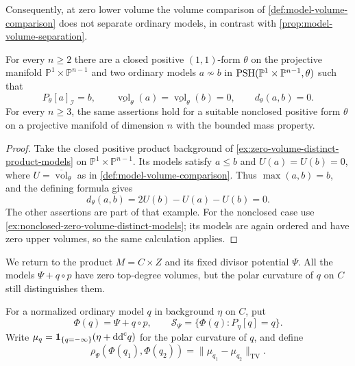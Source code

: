 Consequently, at zero lower volume the volume comparison of \cref{def:model-volume-comparison} does not separate ordinary models, in contrast with \cref{prop:model-volume-separation}.

\begin{example}\label{ex:zero-volume-comparison-collapse}
For every $n\geq2$ there are a closed positive $(1,1)$-form $\theta$ on the projective manifold $\mathbb P^1\times\mathbb P^{n-1}$ and two ordinary models $a\not\sim b$ in $\mathrm{PSH}(\mathbb P^1\times\mathbb P^{n-1},\theta)$ such that
\[
 P_\theta[a]_{\mathcal I}=b,\qquad
 \underline{\operatorname{vol}}_\theta(a)
 =\underline{\operatorname{vol}}_\theta(b)=0,\qquad
 d_\theta(a,b)=0.
\]
For every $n\geq3$, the same assertions hold for a suitable nonclosed positive form $\theta$ on a projective manifold of dimension $n$ with the bounded mass property.
\end{example}
\begin{proof}
Take the closed positive product background of \cref{ex:zero-volume-distinct-product-models} on $\mathbb P^1\times\mathbb P^{n-1}$. Its models satisfy $a\leq b$ and $U(a)=U(b)=0$, where $U=\overline{\operatorname{vol}}_\theta$ as in \cref{def:model-volume-comparison}. Thus $\max(a,b)=b$, and the defining formula gives
\[
 d_\theta(a,b)=2U(b)-U(a)-U(b)=0.
\]
The other assertions are part of that example.
For the nonclosed case use \cref{ex:nonclosed-zero-volume-distinct-models}; its models are again ordered and have zero upper volumes, so the same calculation applies.
\end{proof}

We return to the product $M=C\times Z$ and its fixed divisor potential $\Psi$. All the models $\Psi+q\circ p$ have zero top-degree volumes, but the polar curvature of $q$ on $C$ still distinguishes them.

\begin{definition}\label{def:divisorial-product-model-locus}
For a normalized ordinary model $q$ in background $\eta$ on $C$, put
\[
 \Phi(q)=\Psi+q\circ p,\qquad
 \mathcal S_\Psi=\{\Phi(q):P_\eta[q]=q\}.
\]
Write $\mu_q=\mathbf1_{\{q=-\infty\}}(\eta+\mathrm{dd}^{\mathrm{c}} q)$ for the polar curvature of $q$, and define
\begin{equation}\label{eq:divisorial-product-polar-metric}
 \rho_\Psi(\Phi(q_1),\Phi(q_2))
       =\|\mu_{q_1}-\mu_{q_2}\|_{\mathrm{TV}}.
\end{equation}
\end{definition}

